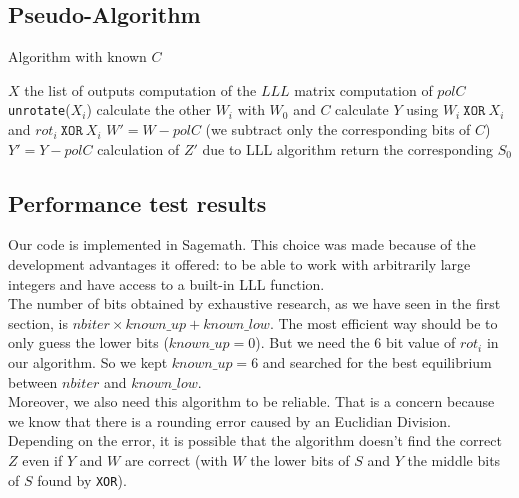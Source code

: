 \documentclass[preprint]{iacrtrans}
\begin{document}
\newpage
 
\subsection{Pseudo-Algorithm}

\begin{algorithm}[h!]
\caption{Algorithm with known $C$}
\begin{algorithmic}
\REQUIRE $X$ the list of outputs
\STATE computation of the $LLL$ matrix
\STATE computation of $polC$
        \STATE \texttt{unrotate}($X_i$)
    \ENDFOR
        \STATE calculate the other $W_i$ with $W_0$ and $C$
        \STATE calculate $Y$ using $W_i\ \mathtt{XOR}\ X_i$ and $rot_i\ \mathtt{XOR}\ X_i$
        \STATE $W' = W - polC$ (we subtract only the corresponding bits of $C$)
        \STATE $Y' = Y - polC$
        \STATE calculation of $Z'$ due to LLL algorithm
                \STATE return the corresponding $S_0$
            \ENDIF
        \ENDIF
    \ENDFOR
\ENDFOR
\end{algorithmic}
\end{algorithm}
                
\subsection{Performance test results}
Our code is implemented in Sagemath. This choice was made because of the development advantages it offered: to be able to work with arbitrarily large integers and have access to a built-in LLL function.\\

The number of bits obtained by exhaustive research, as we have seen in the first section, is $nbiter \times known\_up + known\_low$. The most efficient way should be to only guess the lower bits ($known\_up = 0$). But we need the 6 bit value of $rot_i$ in our algorithm. So we kept $known\_up = 6$ and searched for the best equilibrium between $nbiter$ and $known\_low$. \\ 

Moreover, we also need this algorithm to be reliable. That is a concern because we know that there is a rounding error caused by an Euclidian Division. Depending on the error, it is possible that the algorithm doesn't find the correct $Z$ even if $Y$ and $W$ are correct (with $W$ the lower bits of $S$ and $Y$ the middle bits of $S$ found by \texttt{XOR}). \\
\end{document}
